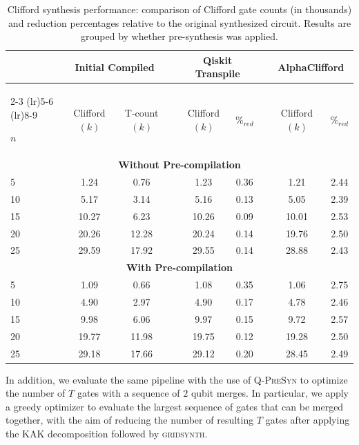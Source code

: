 \documentclass[conference]{IEEEtran}
\begin{document}
\begin{table}[!htb]
    \centering
    \begin{tabular}{lcccccccc}
        \toprule
        & \multicolumn{2}{c}{Initial Compiled} & & \multicolumn{2}{c}{Qiskit Transpile} & & \multicolumn{2}{c}{\textbf{AlphaClifford}} \\
        \cmidrule(lr){2-3} \cmidrule(lr){5-6} \cmidrule(lr){8-9}
        
        $n$ & Clifford $(k)$ & T-count $(k)$ & & Clifford $(k)$ & $\%_{red}$ & & Clifford $(k)$ & $\%_{red}$ \\
        \midrule
        \multicolumn{9}{c}{\textbf{Without Pre-compilation}} \\
        \midrule
        5  & 1.24  & 0.76  & & 1.23  & 0.36 & & 1.21  & 2.44 \\
        10 & 5.17  & 3.14  & & 5.16  & 0.13 & & 5.05  & 2.39 \\
        15 & 10.27 & 6.23  & & 10.26 & 0.09 & & 10.01 & 2.53 \\
        20 & 20.26 & 12.28 & & 20.24 & 0.14 & & 19.76 & 2.50 \\
        25 & 29.59 & 17.92 & & 29.55 & 0.14 & & 28.88 & 2.43 \\
        \midrule
        \multicolumn{9}{c}{\textbf{With Pre-compilation}} \\
        \midrule
        5  & 1.09 & 0.66 & & 1.08 & 0.35 & & 1.06 & 2.75 \\
        10 & 4.90 & 2.97 & & 4.90 & 0.17 & & 4.78 & 2.46 \\
        15 & 9.98 & 6.06 & & 9.97 & 0.15 & & 9.72 & 2.57 \\
        20 & 19.77 & 11.98 & & 19.75 & 0.12 & & 19.28 & 2.50 \\
        25 & 29.18 & 17.66 & & 29.12 & 0.20 & & 28.45 & 2.49 \\
        \bottomrule
    \end{tabular}
    \caption{Clifford synthesis performance: comparison of Clifford gate counts (in thousands) and reduction percentages relative to the original synthesized circuit. Results are grouped by whether pre-synthesis \cite{qpresyn} was applied.}
    \label{tab:logic_synthesis_restructured}
\end{table}

In addition, we evaluate the same pipeline with the use of  \textsc{Q-PreSyn} \cite{qpresyn} to optimize the number of $T$ gates with a sequence of $2$ qubit merges. In particular, we apply a greedy optimizer to evaluate the largest sequence of gates that can be merged together, with the aim of reducing the number of resulting $T$ gates after applying the KAK decomposition followed by \textsc{gridsynth}.
\end{document}
